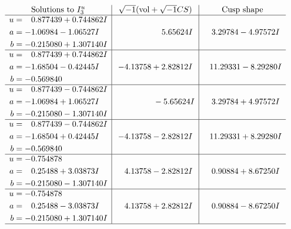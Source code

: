 \documentclass[1p]{elsarticle_modified}
\theoremstyle{definition}
\newcommand{\I}{\sqrt{-1}}
\begin{document}
$$\begin{array}{c|c|c}  
\text{Solutions to }I^u_{3}& \I (\text{vol} + \sqrt{-1}CS) & \text{Cusp shape}\\
 \hline 
\begin{aligned}
u &= \phantom{-}0.877439 + 0.744862 I \\
a &= -1.06984 - 1.06527 I \\
b &= -0.215080 + 1.307140 I\end{aligned}
 & \phantom{-0.000000 -}5.65624 I & \phantom{-}3.29784 - 4.97572 I \\ \hline\begin{aligned}
u &= \phantom{-}0.877439 + 0.744862 I \\
a &= -1.68504 - 0.42445 I \\
b &= -0.569840\phantom{ +0.000000I}\end{aligned}
 & -4.13758 + 2.82812 I & \phantom{-}11.29331 - 8.29280 I \\ \hline\begin{aligned}
u &= \phantom{-}0.877439 - 0.744862 I \\
a &= -1.06984 + 1.06527 I \\
b &= -0.215080 - 1.307140 I\end{aligned}
 & \phantom{-0.000000 } -5.65624 I & \phantom{-}3.29784 + 4.97572 I \\ \hline\begin{aligned}
u &= \phantom{-}0.877439 - 0.744862 I \\
a &= -1.68504 + 0.42445 I \\
b &= -0.569840\phantom{ +0.000000I}\end{aligned}
 & -4.13758 - 2.82812 I & \phantom{-}11.29331 + 8.29280 I \\ \hline\begin{aligned}
u &= -0.754878\phantom{ +0.000000I} \\
a &= \phantom{-}0.25488 + 3.03873 I \\
b &= -0.215080 - 1.307140 I\end{aligned}
 & \phantom{-}4.13758 - 2.82812 I & \phantom{-}0.90884 + 8.67250 I \\ \hline\begin{aligned}
u &= -0.754878\phantom{ +0.000000I} \\
a &= \phantom{-}0.25488 - 3.03873 I \\
b &= -0.215080 + 1.307140 I\end{aligned}
 & \phantom{-}4.13758 + 2.82812 I & \phantom{-}0.90884 - 8.67250 I\\
 \hline 
 \end{array}$$\newpage\newpage\renewcommand{\arraystretch}{1}
\end{document}
